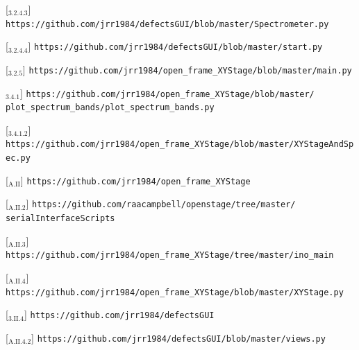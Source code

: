 [\href{https://github.com/jrr1984/defectsGUI/blob/master/Spectrometer.py}{\faGithub$_{3.2.4.3}$}] \texttt{https://github.com/jrr1984/defectsGUI/blob/master/Spectrometer.py}

[\href{https://github.com/jrr1984/defectsGUI/blob/master/start.py}{\faGithub$_{3.2.4.4}$}] \texttt{https://github.com/jrr1984/defectsGUI/blob/master/start.py}

[\href{https://github.com/jrr1984/open\_frame\_XYStage/blob/master/main.py}{\faGithub$_{3.2.5}$}] \texttt{https://github.com/jrr1984/open\_frame\_XYStage/blob/master/main.py}

\href{https://github.com/jrr1984/open\_frame\_XYStage/blob/master/plot\_spectrum\_bands/plot\_spectrum\_bands.py}{\faGithub$_{3.4.1}$}] \texttt{https://github.com/jrr1984/open\_frame\_XYStage/blob/master/\\\hspace{1.5cm}plot\_spectrum\_bands/plot\_spectrum\_bands.py}

[\href{https://github.com/jrr1984/open\_frame\_XYStage/blob/master/XYStageAndSpec.py}{\faGithub$_{3.4.1.2}$}] \texttt{https://github.com/jrr1984/open\_frame\_XYStage/blob/master/XYStageAndSpec.py}

[\href{https://github.com/jrr1984/open\_frame\_XYStage}{\faGithub$_{\text{A.II}}$}] \texttt{https://github.com/jrr1984/open\_frame\_XYStage}

[\href{https://github.com/raacampbell/openstage/tree/master/serialInterfaceScripts}{\faGithub$_{\text{A.II}.2}$}] \texttt{https://github.com/raacampbell/openstage/tree/master/\\\hspace{1.5cm}serialInterfaceScripts}

[\href{https://github.com/jrr1984/open\_frame\_XYStage/tree/master/ino\_main}{\faGithub$_{\text{A.II}.3}$}] \texttt{https://github.com/jrr1984/open\_frame\_XYStage/tree/master/ino\_main}

[\href{https://github.com/jrr1984/open\_frame\_XYStage/blob/master/XYStage.py}{\faGithub$_{\text{A.II}.4}$}] \texttt{https://github.com/jrr1984/open\_frame\_XYStage/blob/master/XYStage.py}

[\href{https://github.com/jrr1984/defectsGUI}{\faGithub$_{3.\text{II}.4}$}] \texttt{https://github.com/jrr1984/defectsGUI}

[\href{https://github.com/jrr1984/defectsGUI/blob/master/views.py}{\faGithub$_{\text{A.II}.4.2}$}] \texttt{https://github.com/jrr1984/defectsGUI/blob/master/views.py}

